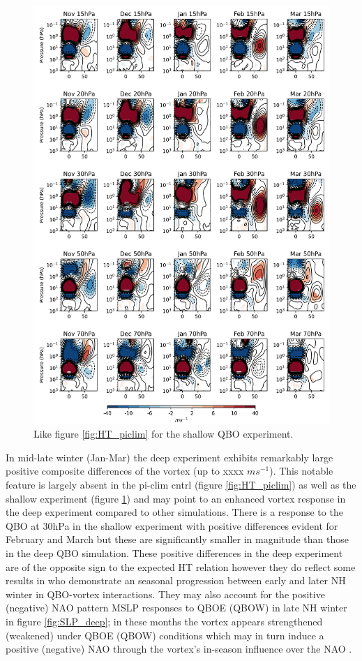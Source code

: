 \begin{figure}[h!]
\begin{center}
\noindent\includegraphics[width = 0.9\linewidth]{Figures/Figures-deepQBO/ZMZW_composites_by_month_QBO_phases_U_s_MarQBO_vs_Mar_70hPa_5thresh.png}
\caption[]{Like figure \ref{fig:HT_piclim} for the shallow QBO experiment.}
\label{fig:HT_shallow}
\end{center}
\end{figure}
\newpage 

In mid-late winter (Jan-Mar) the deep experiment exhibits remarkably large positive composite differences of the vortex (up to xxxx $ms^{-1}$). This notable feature is largely absent in the pi-clim cntrl (figure \ref{fig:HT_piclim}) as well as the shallow experiment (figure \ref{fig:HT_shallow}) and may point to an enhanced vortex response in the deep experiment compared to other simulations. There is a response to the QBO at 30hPa in the shallow experiment with positive differences evident for February and March but these are significantly smaller in magnitude than those in the deep QBO simulation. These positive differences in the deep experiment are of the opposite sign to the expected HT relation however they do reflect some results in \cite{graySurface2018b} who demonstrate an seasonal progression between early and later NH winter in QBO-vortex interactions. They may also account for the positive (negative) NAO pattern MSLP responses to QBOE (QBOW) in late NH winter in figure \ref{fig:SLP_deep}; in these months the vortex appears strengthened (weakened) under QBOE (QBOW) conditions which may in turn induce a positive (negative) NAO through the vortex's in-season influence over the NAO \citep{charlton-perezInfluence2018e}. 

